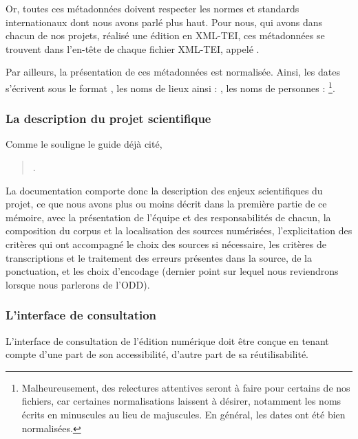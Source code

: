Or, toutes ces métadonnées doivent respecter les normes et standards internationaux dont nous avons parlé plus haut. Pour nous, qui avons dans chacun de nos projets, réalisé une édition en XML-TEI, ces métadonnées se trouvent dans l'en-tête de chaque fichier XML-TEI, appelé .

Par ailleurs, la présentation de ces métadonnées est normalisée. Ainsi, les dates s'écrivent sous le format , les noms de lieux ainsi : , les noms de personnes : \footnote{Malheureusement, des relectures attentives seront à faire pour certains de nos fichiers, car certaines normalisations laissent à désirer, notamment les noms écrits en minuscules au lieu de majuscules. En général, les dates ont été bien normalisées.}.

\subsubsection{La description du projet scientifique}

Comme le souligne le guide déjà cité, 
\begin{quote}
    . 
\end{quote}

La documentation comporte donc la description des enjeux scientifiques du projet, ce que nous avons plus ou moins décrit dans la première partie de ce mémoire, avec la présentation de l'équipe et des responsabilités de chacun, la composition du corpus et la localisation des sources numérisées, l'explicitation des critères qui ont accompagné le choix des sources si nécessaire, les critères de transcriptions et le traitement des erreurs présentes dans la source, de la ponctuation, et les choix d'encodage (dernier point sur lequel nous reviendrons lorsque nous parlerons de l'ODD).

\subsubsection{L'interface de consultation}

L'interface de consultation de l'édition numérique doit être conçue en tenant compte d'une part de son accessibilité, d'autre part de sa réutilisabilité.\\

